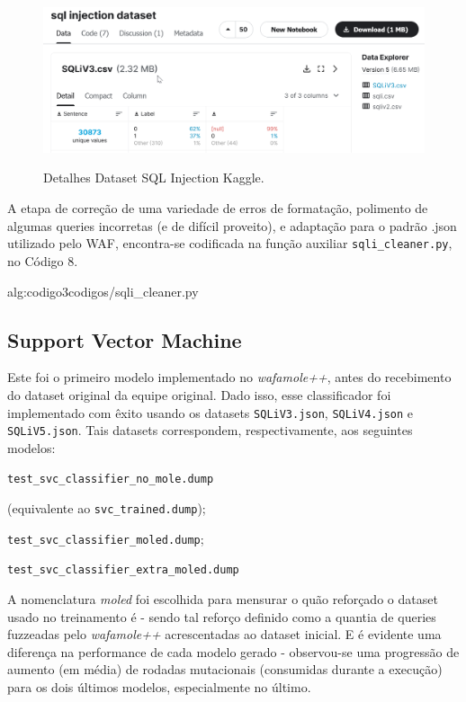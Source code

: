 \begin{figure}[ht]
    \centering
    \caption{Detalhes Dataset SQL Injection Kaggle.}
    \includegraphics[width=16cm]{figuras/sqlInjectionDataset.png} 
    \label{fig:internet} 
\end{figure}

A etapa de correção de uma variedade de erros de formatação, polimento de algumas queries incorretas (e de difícil proveito), e adaptação para o padrão .json utilizado pelo WAF, encontra-se codificada na função auxiliar \verb+sqli_cleaner.py+, no Código 8.


\label{sec:codigos:sqli_cleaner}
 {alg:codigo3}{codigos/sqli_cleaner.py}
\bigskip


\subsection{Support Vector Machine}
Este foi o primeiro modelo implementado no \textit{wafamole++}, antes do recebimento do dataset original da equipe original. Dado isso, esse classificador foi implementado com êxito usando os datasets \verb+SQLiV3.json+, \verb+SQLiV4.json+ e \verb+SQLiV5.json+. Tais datasets correspondem, respectivamente, aos seguintes modelos:
\begin{alineas}
\item \verb+test_svc_classifier_no_mole.dump+

(equivalente ao \verb+svc_trained.dump+);
\item \verb+test_svc_classifier_moled.dump+;
\item \verb+test_svc_classifier_extra_moled.dump+ 
\end{alineas}

A nomenclatura \textit{moled} foi escolhida para mensurar o quão reforçado o dataset usado no treinamento é - sendo tal reforço definido como a quantia de queries fuzzeadas pelo \textit{wafamole++} acrescentadas ao dataset inicial. E é evidente uma diferença na performance de cada modelo gerado - observou-se uma progressão de aumento (em média) de rodadas mutacionais (consumidas durante a execução) para os dois últimos modelos, especialmente no último.

